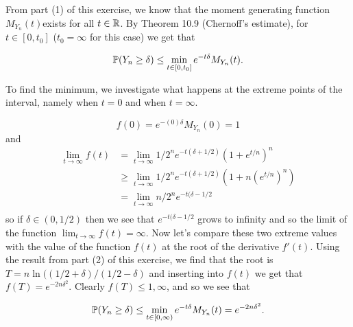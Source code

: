 
From part (1) of this exercise, we know that the moment generating function $ M_{Y_{n} } (t) $exists for all $ t \in
\R$. By Theorem 10.9 (Chernoff's estimate), for $ t \in [0, t_0]$ ($ t_0 = \infty$ for this case)
we get that 

\[
    \P( Y_{n } \geq \delta) \leq \min_{t\in [0,t_0]} e^{-t \delta} M_{Y_{n} } (t)
.\] 

To find the minimum, we investigate what happens at the extreme points of the interval, namely when
$ t = 0$ and when $ t = \infty$.

\[
    f(0) = e^{-(0)\delta} M_{Y_{n} } (0) = 1
\] 
and
\begin{align*}
    \lim_{t \to \infty} f(t) &= \lim_{t \to \infty} 1/2^{n} e^{-t(\delta + 1/2)} (1+ e^{t/n} )^{n} \\
			     &\geq \lim_{t \to \infty} 1/2^{n} e^{-t(\delta +1/2)} (1 + n (e^{t/n})^{n} )\\
			     &= \lim_{t \to \infty} n/2^{n} e^{-t(\delta - 1/2}  \\
\end{align*}
so if $ \delta \in (0, 1/2)$ then we see that $ e^{-t(\delta - 1/2}$ grows to infinity and so the
limit of the function $ \lim_{t \to \infty} f(t) = \infty$. 
Now let's compare these two extreme values with the value of the function $ f(t)$ at the root of the
derivative $ f'(t)$. Using the result from part (2) of this exercise, we find that the root 
is $ T = n \ln ((1/2 + \delta)/(1/2 - \delta)$ and inserting into $ f(t)$ we get
that $ f(T) = e^{-2n \delta^2} $. Clearly $ f(T) \leq 1, \infty$, and so we see that

\[
    \P(Y_{n} \geq \delta) \leq \min_{t \in [0, \infty)} e^{-t\delta} M_{Y_{n} } (t) = e^{-2n
    \delta^2} 
.\] 

